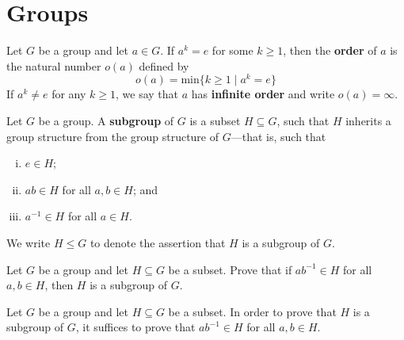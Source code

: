\section{Groups}

\todo{}

\begin{definition}
\label{defOrderOfElementOfGroup}
Let $G$ be a group and let $a \in G$. If $a^k = e$ for some $k \ge 1$, then the \textbf{order} of $a$ is the natural number $o(a)$ defined by
\[ o(a) = \mathrm{min} \{ k \ge 1 \mid a^k = e \} \]
If $a^k \ne e$ for any $k \ge 1$, we say that $a$ has \textbf{infinite order} and write $o(a) = \infty$.
\end{definition}

\todo{}

\begin{definition}
\label{defSubgroup}
Let $G$ be a group. A \textbf{subgroup} of $G$ is a subset $H \subseteq G$, such that $H$ inherits a group structure from the group structure of $G$---that is, such that
\begin{enumerate}[(i)]
\item $e \in H$;
\item $ab \in H$ for all $a,b \in H$; and
\item $a^{-1} \in H$ for all $a \in H$.
\end{enumerate}
We write $H \le G$  to denote the assertion that $H$ is a subgroup of $G$.
\end{definition}

\begin{exercise}
Let $G$ be a group and let $H \subseteq G$ be a subset. Prove that if $ab^{-1} \in H$ for all $a,b \in H$, then $H$ is a subgroup of $G$.
\end{exercise}

\begin{strategy}
\label{strCriterionForSubgroup}
Let $G$ be a group and let $H \subseteq G$ be a subset. In order to prove that $H$ is a subgroup of $G$, it suffices to prove that $ab^{-1} \in H$ for all $a,b \in H$.
\end{strategy}

\todo{}


